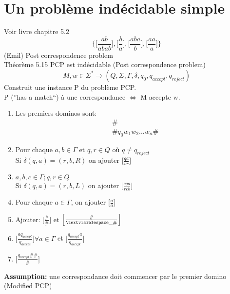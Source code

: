 \documentclass[a4paper,12pt]{article}
\begin{document}
\section{Un problème indécidable simple}
  Voir livre chapitre 5.2\\
  $$\Bigg\{\Big[\frac{ab}{abab}\Big], \Big[\frac{b}{a}\Big], \Big[\frac{aba}{b}\Big], \Big[\frac{aa}{a}\Big]\Bigg\}$$
  (Emil) Post correspondence problem\\
  Théorème 5.15 PCP est indécidable (Post correspondence problem)\\
  
  $$M, w \in \Sigma^* \rightarrow (Q, \Sigma, \Gamma, \delta, q_0, q_{accept}, q_{reject})$$
  Construit une instance P du problème PCP.\\
  P (''has a match``) à une correspondance $\Leftrightarrow$ M accepte w.
  
  \begin{enumerate}
    \item Les premiers dominos sont:
      \begin{align*}
	&\#\\
	&\# q_0 w_1 w_2 ... w_n \#
      \end{align*}
    \item Pour chaque $a, b \in \Gamma$ et $q, r \in Q$ où $q \neq q_{reject}$\\
      Si $\delta(q, a) = (r, b, R)$ on ajouter $\Big[\frac{qa}{br}\Big]$
    \item $a, b, c \in \Gamma; q, r \in Q$\\
      Si $\delta(q, a) = (r, b, L)$ on ajouter $\Big[\frac{cqa}{rcb}\Big]$
    \item Pour chaque $a \in \Gamma$, on ajouter $\Big[\frac{a}{a}\Big]$
    \item Ajouter: $\Big[\frac{\#}{\#}\Big]$ et $\Big[\frac{\#}{\textvisiblespace \_ \#}\Big]$
    \item $\Big[\frac{a q_{accept}}{q_{accept}}\Big] \forall a \in \Gamma$ et $\Big[\frac{q_{accept} a}{q_{accept}}\Big]$
    \item $\Big[\frac{q_{accept} \# \#}{\#}\Big]$
  \end{enumerate}
  
  \textbf{Assumption:} une correspondance doit commencer par le premier domino (Modified PCP)\\
  
\end{document}
